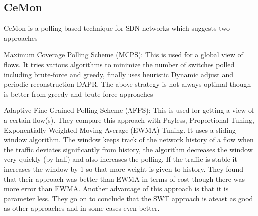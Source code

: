 


\subsection{CeMon}
CeMon\cite{CEMON} is a polling-based technique for SDN networks which suggests two approaches

Maximum Coverage Polling Scheme (MCPS):
This is used for a global view of flows. It tries various algorithms to minimize the number of switches polled including brute-force and greedy, finally uses heuristic Dynamic adjust and periodic reconstruction DAPR. The above strategy is not always optimal though is better from greedy and brute-force approaches

Adaptive-Fine Grained Polling Scheme (AFPS):
This is used for getting a view of a certain flow(s). They compare this approach with Payless, Proportional Tuning, Exponentially Weighted Moving Average (EWMA) Tuning. It uses a sliding window algorithm. The window keeps track of the network history of a flow when the traffic deviates significantly from history, the algorithm decreases the window very quickly (by half) and also increases the polling. If the traffic is stable it increases the window by 1 so that more weight is given to history. They found that their approach was better than EWMA in terms of cost though there was more error than EWMA. Another advantage of this approach is that it is parameter less.
They go on to conclude that the SWT approach is ateast as good as other approaches and in some cases even better.



